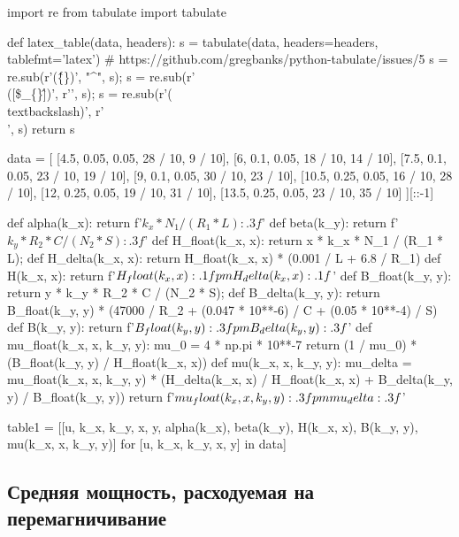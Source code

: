 \documentclass[12pt, a4paper]{article}
\begin{document}
\begin{pycode}
import re
from tabulate import tabulate

def latex_table(data, headers):
  s = tabulate(data, headers=headers, tablefmt='latex')
  # https://github.com/gregbanks/python-tabulate/issues/5
  s = re.sub(r'(\^\{\})', "^", s); s = re.sub(r'\\([\$\_\{\}\^])', r'\1', s); s = re.sub(r'(\\textbackslash{})', r'\\', s)
  return s

data = [
  [4.5, 0.05, 0.05, 28 / 10, 9 / 10],
  [6, 0.1, 0.05, 18 / 10, 14 / 10],
  [7.5, 0.1, 0.05, 23 / 10, 19 / 10],
  [9, 0.1, 0.05, 30 / 10, 23 / 10],
  [10.5, 0.25, 0.05, 16 / 10, 28 / 10],
  [12, 0.25, 0.05, 19 / 10, 31 / 10],
  [13.5, 0.25, 0.05, 23 / 10, 35 / 10]
][::-1]

def alpha(k_x): return f'${k_x * N_1 / (R_1 * L):.3f}$'
def beta(k_y): return f'${k_y * R_2 * C / (N_2 * S):.3f}$'
def H_float(k_x, x): return x * k_x * N_1 / (R_1 * L);
def H_delta(k_x, x): return H_float(k_x, x) * (0.001 / L + 6.8 / R_1)
def H(k_x, x): return f'${H_float(k_x, x):.1f} \\pm {H_delta(k_x, x):.1f}$'
def B_float(k_y, y): return y * k_y * R_2 * C / (N_2 * S);
def B_delta(k_y, y): return B_float(k_y, y) * (47000 / R_2 + (0.047 * 10**-6) / C + (0.05 * 10**-4) / S)
def B(k_y, y): return f'${B_float(k_y, y):.3f} \\pm {B_delta(k_y, y):.3f}$'
def mu_float(k_x, x, k_y, y):
  mu_0 = 4 * np.pi * 10**-7
  return (1 / mu_0) * (B_float(k_y, y) / H_float(k_x, x))
def mu(k_x, x, k_y, y):
  mu_delta = mu_float(k_x, x, k_y, y) * (H_delta(k_x, x) / H_float(k_x, x) + B_delta(k_y, y) / B_float(k_y, y))
  return f'${mu_float(k_x, x, k_y, y):.3f} \\pm {mu_delta:.3f}$'

table1 = [[u, k_x, k_y, x, y, alpha(k_x), beta(k_y), H(k_x, x), B(k_y, y), mu(k_x, x, k_y, y)] for [u, k_x, k_y, x, y] in data]
\end{pycode}

\begin{table}[H]
\end{table}

\subsection*{Средняя мощность, расходуемая на перемагничивание}
\end{document}
